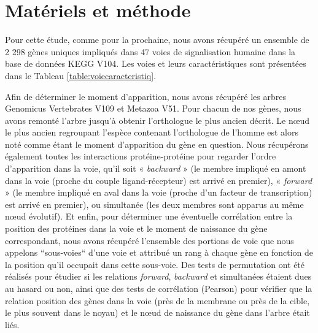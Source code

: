 \section{Matériels et méthode}
\par Pour cette étude, comme pour la prochaine, nous avons récupéré un ensemble de 2 298 gènes uniques impliqués dans 47 voies de signalisation humaine dans la base de données KEGG V104. Les voies et leurs caractéristiques sont présentées dans le Tableau \ref{table:voiecaracteristiq}. 
\par Afin de déterminer le moment d’apparition, nous avons récupéré les arbres Genomicus Vertebrates V109 et Metazoa V51. Pour chacun de nos gènes, nous avons remonté l’arbre jusqu’à obtenir l’orthologue le plus ancien décrit. Le nœud le plus ancien regroupant l’espèce contenant l’orthologue de l’homme est alors noté comme étant le moment d’apparition du gène en question. Nous récupérons également toutes les interactions protéine-protéine pour regarder l’ordre d’apparition dans la voie, qu’il soit « \textit{backward} » (le membre impliqué en amont dans la voie (proche du couple ligand-récepteur) est arrivé en premier), « \textit{forward} » (le membre impliqué en aval dans la voie (proche d’un facteur de transcription) est arrivé en premier), ou simultanée (les deux membres sont apparus au même nœud évolutif). Et enfin, pour déterminer une éventuelle corrélation entre la position des protéines dans la voie et le moment de naissance du gène correspondant, nous avons récupéré l’ensemble des portions de voie que nous appelons “sous-voies“ d’une voie et attribué un rang à chaque gène en fonction de la position qu’il occupait dans cette sous-voie. Des tests de permutation ont été réalisés pour étudier si les relations \textit{forward}, \textit{backward} et simultanées étaient dues au hasard ou non, ainsi que des tests de corrélation (Pearson) pour vérifier que la relation position des gènes dans la voie (près de la membrane ou près de la cible, le plus souvent dans le noyau) et le nœud de naissance du gène dans l’arbre était liés. 


